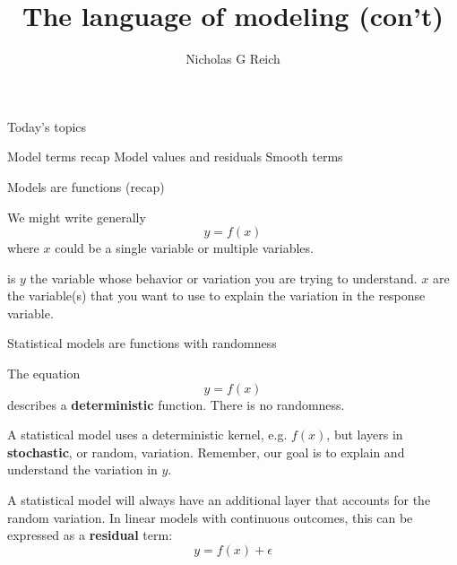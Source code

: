 \documentclass[table]{beamer}\usepackage[]{graphicx}\usepackage[]{color}
\title{The language of modeling (con't)}
\author{Nicholas G Reich}
\begin{document}
\begin{frame}[plain]
	\titlepage
\end{frame}











\begin{frame}{Today's topics}

\bi
    \myitem Model terms recap
    \myitem Model values and residuals
    \myitem Smooth terms
\ei



\end{frame}



\begin{frame}[fragile]{Models are functions (recap)}

We might write generally $$ y = f(x)$$ where $x$ could be a single variable or multiple variables.

\bi
   is $y$ the variable whose behavior or variation you are trying to understand. 
   $x$ are the variable(s) that you want to use to explain the variation in the response variable.
\ei

\end{frame}



\begin{frame}[fragile]{Statistical models are functions with randomness}

\bi
\myitem The equation $$y = f(x)$$ describes a {\bf deterministic} function. There is no randomness.

\myitem A statistical model uses a deterministic kernel, e.g. $f(x)$, but layers in {\bf stochastic}, or random, variation. Remember, our goal is to explain and understand the variation in $y$.

\myitem A statistical model will always have an additional layer that accounts for the random variation. In linear models with continuous outcomes, this can be expressed as a {\bf residual} term:
$$y = f(x) + \epsilon$$
\ei

\end{frame}
\end{document}
